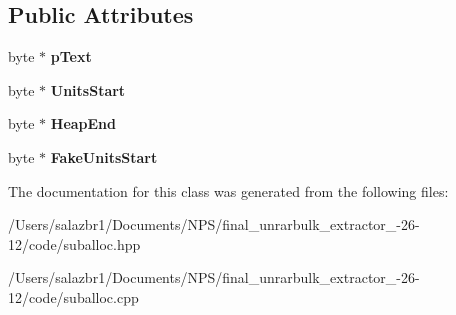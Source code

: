 \subsection*{Public Attributes}
\begin{DoxyCompactItemize}
\item 
\hypertarget{class_sub_allocator_a38eca006c5fc86d70be3278a28e1fb73}{byte $\ast$ {\bfseries p\-Text}}\label{class_sub_allocator_a38eca006c5fc86d70be3278a28e1fb73}

\item 
\hypertarget{class_sub_allocator_accd9fa3946e8b71af00e6484afb711a1}{byte $\ast$ {\bfseries Units\-Start}}\label{class_sub_allocator_accd9fa3946e8b71af00e6484afb711a1}

\item 
\hypertarget{class_sub_allocator_a5cbcfb8037403a6d06cf50236fa278c7}{byte $\ast$ {\bfseries Heap\-End}}\label{class_sub_allocator_a5cbcfb8037403a6d06cf50236fa278c7}

\item 
\hypertarget{class_sub_allocator_a90ed7682a5ab2da5f8b051e98f0c9e59}{byte $\ast$ {\bfseries Fake\-Units\-Start}}\label{class_sub_allocator_a90ed7682a5ab2da5f8b051e98f0c9e59}

\end{DoxyCompactItemize}


The documentation for this class was generated from the following files\-:\begin{DoxyCompactItemize}
\item 
/\-Users/salazbr1/\-Documents/\-N\-P\-S/final\-\_\-unrarbulk\-\_\-extractor\-\_-\/26-\/12/code/suballoc.\-hpp\item 
/\-Users/salazbr1/\-Documents/\-N\-P\-S/final\-\_\-unrarbulk\-\_\-extractor\-\_-\/26-\/12/code/suballoc.\-cpp\end{DoxyCompactItemize}

